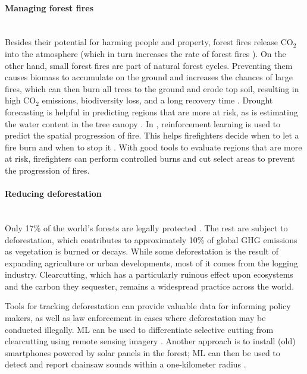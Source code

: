 \documentclass[11pt]{report}
\newcommand{\Gap}{\texorpdfstring{\hfill}{}}
\newcommand{\Rec}{\texorpdfstring{{\small\emph{\color{blue}{\fbox{High Leverage}}}}}{}}
\newcommand{\cd}{CO$_2$\xspace}
\begin{document}
\paragraph{Managing forest fires}\Gap\mbox{}\\
Besides their potential for harming people and property, forest fires release \cd into the atmosphere (which in turn increases the rate of forest fires \cite{westerling2016increasing}). On the other hand, small forest fires are part of natural forest cycles. Preventing them causes biomass to accumulate on the ground and increases the chances of large fires, which can then burn all trees to the ground and erode top soil, resulting in high \cd emissions, biodiversity loss, and a long recovery time \cite{montgomery2014agent}.
Drought forecasting \cite{rhee2016drought} is helpful in predicting regions that are more at risk, as is estimating the water content in the tree canopy \cite{brodrick2019forest}. In \cite{ganapathi2018using, ganapathi2018combining}, reinforcement learning is used to predict the spatial progression of fire. This helps firefighters decide when to let a fire burn and when to stop it \cite{houtman2013allowing}. With good tools to evaluate regions that are more at risk, firefighters can perform controlled burns and cut select areas to prevent the progression of fires. 

\paragraph{Reducing deforestation}\Gap 
\textbf{\Rec}\mbox{}\\
Only 17\% of the world's forests are legally protected \cite{macdicken2016global}. The rest are subject to deforestation, which contributes to approximately 10\% of global GHG emissions \cite{ipcc2014summary} as vegetation is burned or decays. While some deforestation is the result of expanding agriculture or urban developments, most of it comes from the logging industry. Clearcutting, which has a particularly ruinous effect upon ecosystems and the carbon they sequester, remains a widespread practice across the world.

Tools for tracking deforestation can provide valuable data for informing policy makers, as well as law enforcement in cases where deforestation may be conducted illegally. ML can be used to differentiate selective cutting from clearcutting using remote sensing imagery \cite{hethcoat2019machine, lippitt2008mapping, baccini2012estimated, defries2002carbon}. Another approach is to install (old) smartphones powered by solar panels in the forest; ML can then be used to detect and report chainsaw sounds within a one-kilometer radius \cite{rfcx}.
\end{document}
